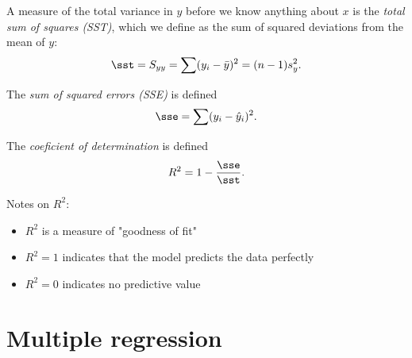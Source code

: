 \documentclass{article}
\begin{document}
\begin{definition}
	A measure of the total variance in $y$ before we know anything
	about $x$ is the \emph{total sum of squares (SST)}, which we define
	as the sum of squared deviations from the mean of $y$:
	\begin{align*}
		\sst = S_{yy} = \sum (y_i - \bar y)^2 = (n-1)s^2_y.
	\end{align*}
\end{definition}
\begin{definition}
	The \emph{sum of squared errors (SSE)} is defined
	\begin{align*}
		\sse = \sum (y_i -\hat y_i)^2.
	\end{align*}
\end{definition}
\begin{definition}
	The \emph{coeficient of determination} is defined
	\begin{align*}
		R^2 = 1-\frac{\sse}{\sst}.
	\end{align*}
\end{definition}
Notes on $R^2$:
\begin{itemize}
	\item $R^2$ is a measure of "goodness of fit"
	\item $R^2=1$ indicates that the model predicts the data perfectly
	\item $R^2=0$ indicates no predictive value
\end{itemize}


\section{Multiple regression}
\end{document}
